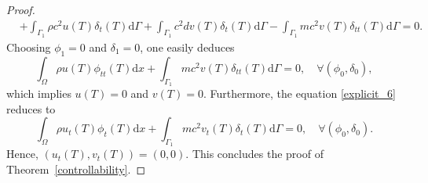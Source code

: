 \documentclass[10pt,a4paper]{amsart}
\begin{document}
\begin{proof}
\begin{equation}
\begin{split}
&  + \int_{\Gamma_1}\rho c^2 u(T)\delta_t(T)\mathrm{d}\Gamma+ \int_{\Gamma_1}c^2 d v(T)\delta_t(T)\mathrm{d}\Gamma - \int_{\Gamma_1}m c^2 v(T)\delta_{tt}(T)\mathrm{d}\Gamma = 0.
\end{split}
\end{equation}
Choosing $\phi_1=0$ and $\delta_1=0$, one easily deduces 
\[
\int_{\Omega}\rho u(T)\phi_{tt}(T)\mathrm{d}x + \int_{\Gamma_1}m c^2 v(T)\delta_{tt}(T)\mathrm{d}\Gamma = 0, \quad \forall (\phi_0, \delta_0),
\]
which implies $u(T) = 0$ and $v(T) = 0$. Furthermore, the equation \eqref{explicit_6} reduces to
\[
\int_{\Omega}\rho u_{t}(T)\phi_t(T)\mathrm{d}x + \int_{\Gamma_1}m c^2 v_{t}(T)\delta_t(T)\mathrm{d}\Gamma = 0, \quad \forall (\phi_0, \delta_0).
\]
Hence, $(u_{t}(T), v_{t}(T))=(0, 0)$. This concludes the proof of Theorem~\ref{controllability}.
\end{proof}
\end{document}
